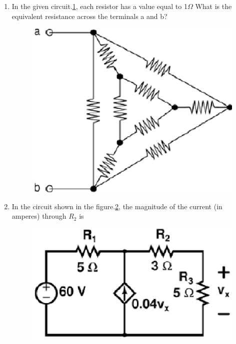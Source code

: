 \documentclass[journal,12pt,twocolumn]{IEEEtran}
\begin{document}
\begin{enumerate}
\item In the given circuit.\ref{fig106}, each resistor has a value equal to 1$ \Omega $
What is the equivalent resistance across the terminals a and b?
\begin{figure}[!h]
\begin{center}
\includegraphics[scale=0.5]{./figs/fig106.eps}
\caption{}
\label{fig106}
\end{center}
\end{figure}

\begin{enumerate}
\setlength\itemsep{2em}
\end{enumerate}

\item In the circuit shown in the figure.\ref{fig107}, the magnitude of the current (in amperes) through $R_{2}$ is
\begin{figure}[!h]
\begin{center}
\includegraphics[scale=0.5]{./figs/fig107.eps}
\caption{}
\label{fig107}
\end{center}
\end{figure}




\end{enumerate}
\end{document}
